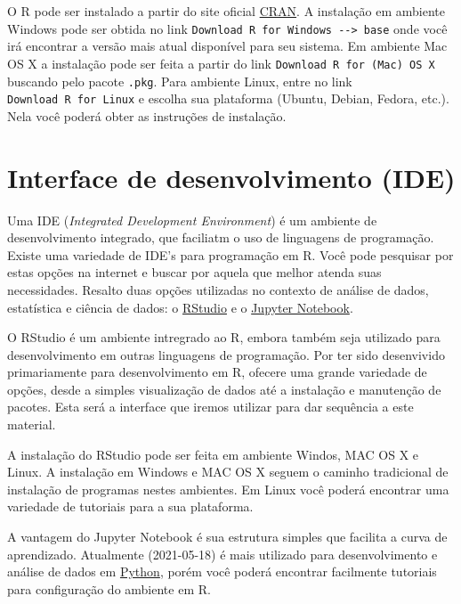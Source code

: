 \documentclass[
]{book}
\begin{document}
O R pode ser instalado a partir do site oficial \href{https://cran.r-project.org/}{CRAN}. A instalação em ambiente Windows pode ser obtida no link \texttt{Download\ R\ for\ Windows\ -\/-\textgreater{}\ base} onde você irá encontrar a versão mais atual disponível para seu sistema. Em ambiente Mac OS X a instalação pode ser feita a partir do link \texttt{Download\ R\ for\ (Mac)\ OS\ X} buscando pelo pacote \texttt{.pkg}. Para ambiente Linux, entre no link \texttt{Download\ R\ for\ Linux} e escolha sua plataforma (Ubuntu, Debian, Fedora, etc.). Nela você poderá obter as instruções de instalação.

\hypertarget{interface-de-desenvolvimento-ide}{%
\section{Interface de desenvolvimento (IDE)}\label{interface-de-desenvolvimento-ide}}

Uma IDE (\emph{Integrated Development Environment}) é um ambiente de desenvolvimento integrado, que faciliatm o uso de linguagens de programação. Existe uma variedade de IDE's para programação em R. Você pode pesquisar por estas opções na internet e buscar por aquela que melhor atenda suas necessidades. Resalto duas opções utilizadas no contexto de análise de dados, estatística e ciência de dados: o \href{https://rstudio.com/}{RStudio} e o \href{https://jupyter.org/index.html}{Jupyter Notebook}.

O RStudio é um ambiente intregrado ao R, embora também seja utilizado para desenvolvimento em outras linguagens de programação. Por ter sido desenvivido primariamente para desenvolvimento em R, ofecere uma grande variedade de opções, desde a simples visualização de dados até a instalação e manutenção de pacotes. Esta será a interface que iremos utilizar para dar sequência a este material.

A instalação do RStudio pode ser feita em ambiente Windos, MAC OS X e Linux. A instalação em Windows e MAC OS X seguem o caminho tradicional de instalação de programas nestes ambientes. Em Linux você poderá encontrar uma variedade de tutoriais para a sua plataforma.

A vantagem do Jupyter Notebook é sua estrutura simples que facilita a curva de aprendizado. Atualmente (2021-05-18) é mais utilizado para desenvolvimento e análise de dados em \href{https://www.python.org/}{Python}, porém você poderá encontrar facilmente tutoriais para configuração do ambiente em R.
\end{document}
